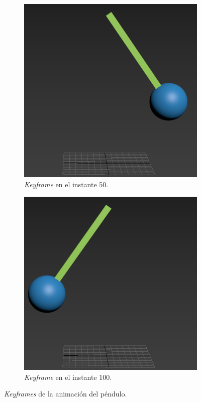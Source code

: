 \documentclass{article}
\begin{document}
\begin{figure}[H]
\begin{subfigure}[H]{0.3\textwidth}
	    \includegraphics[width=\textwidth]{imagenes/Ejercicio 3/pen_50.png}
        \caption{\textit{Keyframe} en el instante 50.}
	\end{subfigure}
    \hfill
	\begin{subfigure}[H]{0.3\textwidth}
	    \centering
	    \includegraphics[width=\textwidth]{imagenes/Ejercicio 3/pen_0.png}
        \caption{\textit{Keyframe} en el instante 100.}
	\end{subfigure}
    \caption{\textit{Keyframes} de la animación del péndulo.}
\end{figure}
\end{document}
